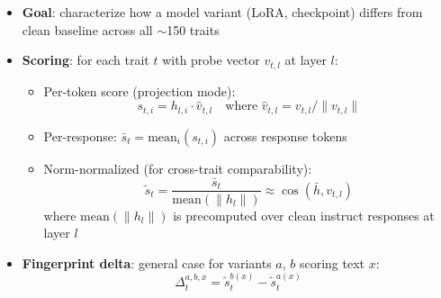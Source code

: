 \documentclass[11pt]{article}
\begin{document}
\begin{itemize}
  \item \textbf{Goal}: characterize how a model variant (LoRA, checkpoint) differs from clean baseline across all $\sim$150 traits

  \item \textbf{Scoring}: for each trait $t$ with probe vector $v_{t,l}$ at layer $l$:
  \begin{itemize}
    \item Per-token score (projection mode):
    \begin{equation}
      s_{t,i} = h_{l,i} \cdot \hat{v}_{t,l} \quad \text{where } \hat{v}_{t,l} = v_{t,l} / \|v_{t,l}\|
    \end{equation}
    \item Per-response: $\bar{s}_t = \text{mean}_i(s_{t,i})$ across response tokens
    \item Norm-normalized (for cross-trait comparability):
    \begin{equation}
      \tilde{s}_t = \frac{\bar{s}_t}{\text{mean}(\|h_{l}\|)} \approx \cos(\bar{h}, v_{t,l})
    \end{equation}
    where $\text{mean}(\|h_{l}\|)$ is precomputed over clean instruct responses at layer $l$
  \end{itemize}

  \item \textbf{Fingerprint delta}: general case for variants $a$, $b$ scoring text $x$:
  \begin{equation}
    \Delta_t^{a,b,x} = \tilde{s}_t^{b(x)} - \tilde{s}_t^{a(x)}
  \end{equation}


\end{itemize}
\end{document}
